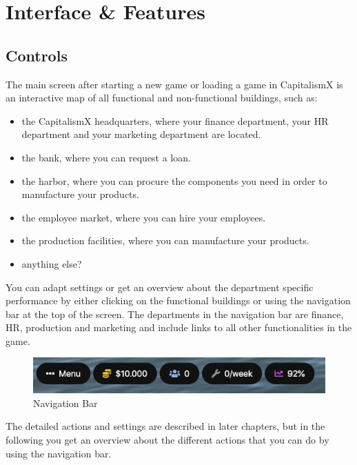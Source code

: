 \documentclass[11pt,titlepage,oneside,openany]{book}
\begin{document}
\section{Interface \& Features}

\subsection{Controls}  
The main screen after starting a new game or loading a game in CapitalismX is an interactive map of all functional and non-functional buildings, such as:
\begin{itemize}
    \item the CapitalismX headquarters, where your finance department, your HR department and your marketing department are located. 
    \item the bank, where you can request a loan.
    \item the harbor, where you can procure the components you need in order to manufacture your products.
    \item the employee market, where you can hire your employees.
    \item the production facilities, where you can manufacture your products.
    \item anything else?
\end{itemize}

You can adapt settings or get an overview about the department specific performance by either clicking on the functional buildings or using the navigation bar at the top of the screen. The departments in the navigation bar are finance, HR, production and marketing and include links to all other functionalities in the game. 
\begin{figure} [!htbp]
    \centering
    \includegraphics [width=\textwidth]{images/navigationBar.png}
    \caption{Navigation Bar}
    \label{fig:navigationBar}
\end{figure} The detailed actions and settings are described in later chapters, but in the following you get an overview about the different actions that you can do by using the navigation bar.
\end{document}
